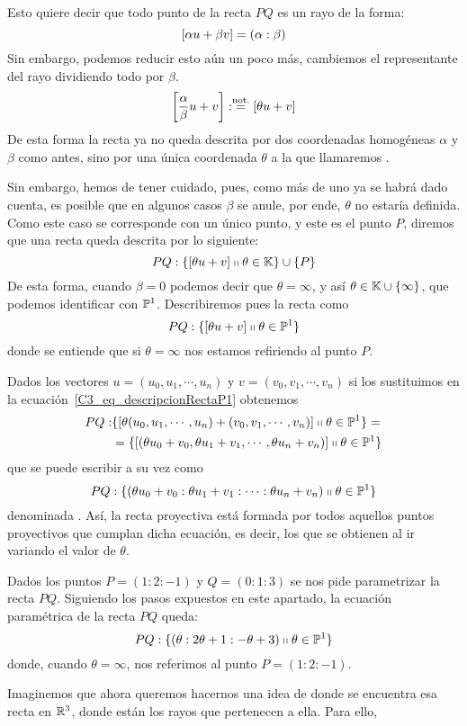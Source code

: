Esto quiere decir que todo punto de la recta $PQ$ es un rayo de la forma: \[\left [ \alpha u+\beta v \right ]=(\alpha:\beta)\]
Sin embargo, podemos reducir esto aún un poco más, cambiemos el representante del rayo dividiendo todo por $\beta$.
\[\left [ \frac{\alpha}{\beta}u+v \right ]:\stackrel{\textrm{not.}}{=}\left [ \theta u+v \right ]\]
De esta forma la recta ya no queda descrita por dos coordenadas homogéneas $\alpha$ y $\beta$ como antes, sino por una única coordenada $\theta$ a la que llamaremos .
	
Sin embargo, hemos de tener cuidado, pues, como más de uno ya se habrá dado cuenta, es posible que en algunos casos $\beta$ se anule, por ende, $\theta$ no estaría definida. Como este caso se corresponde con un único punto, y este es el punto $P$, diremos que una recta queda descrita por lo siguiente:
\begin{equation}
	\label{C3_eq_descripcionRecta}
	PQ:\{\left [ \theta u+v \right ]\shortparallel \theta\in\mathbb{K}\}\cup\{P\}
\end{equation}
De esta forma, cuando $\beta=0$ podemos decir que $\theta=\infty$, y así $\theta\in\mathbb{K}\cup \{\infty\}$, que podemos identificar con $\mathbb{P}^1$. Describiremos pues la recta como
\begin{equation}
	\label{C3_eq_descripcionRectaP1}
	PQ:\{\left [ \theta u+v \right ]\shortparallel \theta\in\mathbb{P}^1\}
\end{equation}
donde se entiende que si $\theta=\infty$ nos estamos refiriendo al punto $P$. 

Dados los vectores $u=(u_0,u_1,\cdots,u_n)$ y $v=(v_0,v_1,\cdots,v_n)$ si los sustituimos en la ecuación~\eqref{C3_eq_descripcionRectaP1} obtenemos
\begin{equation*}
	\label{C_3_eq_parametrica_recta}
	\begin{split}
		PQ:&\{\left [ \theta (u_0,u_1,\cdots,u_n)+(v_0,v_1,\cdots,v_n) \right ]\shortparallel \theta\in\mathbb{P}^1\}=\\
		&=\{\left [ (\theta u_0+v_0,\theta u_1+v_1,\cdots,\theta u_n+v_n) \right ]\shortparallel \theta\in\mathbb{P}^1\}
	\end{split}
\end{equation*}
que se puede escribir a su vez como 
\begin{equation}
	PQ:\{(\theta u_0+v_0:\theta u_1+v_1:\cdots:\theta u_n+v_n)\shortparallel \theta\in\mathbb{P}^1\}
\end{equation}
denominada . Así, la recta proyectiva está formada por todos aquellos puntos proyectivos que cumplan dicha ecuación, es decir, los que se obtienen al ir variando el valor de $\theta$.
\begin{exa}
	\label{C3_exa_rectaConcreta}
	Dados los puntos $P=(1:2:-1)$ y $Q=(0:1:3)$ se nos pide parametrizar la recta $PQ$. Siguiendo los pasos expuestos en este apartado, la ecuación paramétrica de la recta $PQ$ queda:
	\[
	PQ:\{(\theta:2\theta+1:-\theta+3)\shortparallel\theta\in\mathbb{P}^1\}
	\]
	donde, cuando $\theta=\infty$, nos referimos al punto $P=(1:2:-1)$.
	
	Imaginemos que ahora queremos hacernos una idea de donde se encuentra esa recta en $\mathbb{R}^3$, donde están los rayos que pertenecen a ella. Para ello,
\end{exa}
